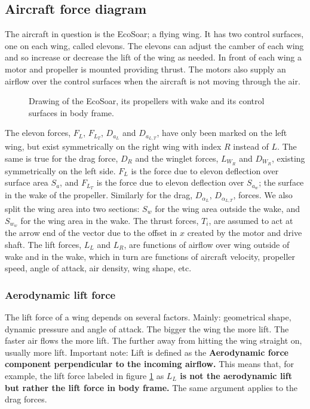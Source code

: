 
\subsection{Aircraft force diagram}
The aircraft in question is the EcoSoar; a flying wing.
It has two control surfaces, one on each wing, called elevons.
The elevons can adjust the camber of each wing and so increase or decrease the lift of the wing as needed.
In front of each wing a motor and propeller is mounted providing thrust.
The motors also supply an airflow over the control surfaces when the aircraft is not moving through the air.


\begin{figure}[h]
    \center
    \begin{tikzpicture}
    
    \end{tikzpicture}
    \caption{Drawing of the EcoSoar, its propellers with wake and its control surfaces in body frame.}
    \label{airplane}
\end{figure}

The elevon forces, $F_L$, $F_{L_T}$, $D_{a_{L}}$ and $D_{a_{L,T}}$, have only been marked on the left wing, but exist symmetrically on the right wing with index $R$ instead of $L$.
The same is true for the drag force, $D_R$ and the winglet forces, $L_{W_R}$ and $D_{W_R}$, existing symmetrically on the left side.
$F_L$ is the force due to elevon deflection over surface area $S_a$, and $F_{L_T}$ is the force due to elevon deflection over $S_{a_w}$; the surface in the wake of the propeller.
Similarly for the drag, $D_{\alpha_L}$, $D_{\alpha_{L,T}}$, forces.
We also split the wing area into two sections: $S_w$ for the wing area outside the wake, and $S_{w_w}$ for the wing area in the wake.
The thrust forces, $T_i$, are assumed to act at the arrow end of the vector due to the offset in $x$ created by the motor and drive shaft.
The lift forces, $L_L$ and $L_R$, are functions of airflow over wing outside of wake and in the wake, which in turn are functions of aircraft velocity, propeller speed, angle of attack, air density, wing shape, etc.



\subsubsection{Aerodynamic lift force}

The lift force of a wing depends on several factors.
Mainly: geometrical shape, dynamic pressure and angle of attack.\cite{aerodynamics}
The bigger the wing the more lift.
The faster air flows the more lift.
The further away from hitting the wing straight on, usually more lift.
Important note: Lift is defined as the \textbf{Aerodynamic force component perpendicular to the incoming airflow.} This means that, for example, the lift force labeled in figure \ref {airplane} as \textbf{$L_L$ is not the aerodynamic lift but rather the lift force in body frame.} The same argument applies to the drag forces.

